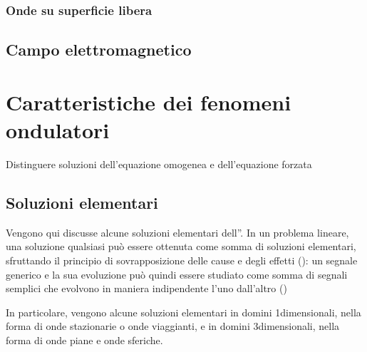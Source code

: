 \documentclass[letterpaper,10pt,italian]{jupyterBook}
\begin{document}
\subsubsection{Onde su superficie libera}
\label{\detokenize{ch/waves/waves-in-physics:onde-su-superficie-libera}}\label{\detokenize{ch/waves/waves-in-physics:physics-hs-waves-equation-examples-fluids-surface}}

\subsection{Campo elettromagnetico}
\label{\detokenize{ch/waves/waves-in-physics:campo-elettromagnetico}}\label{\detokenize{ch/waves/waves-in-physics:physics-hs-waves-equation-examples-em}}
\sphinxstepscope


\section{Caratteristiche dei fenomeni ondulatori}
\label{\detokenize{ch/waves/phenomena:caratteristiche-dei-fenomeni-ondulatori}}\label{\detokenize{ch/waves/phenomena:physics-hs-waves-phenomena}}\label{\detokenize{ch/waves/phenomena::doc}}
\sphinxAtStartPar
Distinguere soluzioni dell’equazione omogenea e dell’equazione forzata


\subsection{Soluzioni elementari}
\label{\detokenize{ch/waves/phenomena:soluzioni-elementari}}\label{\detokenize{ch/waves/phenomena:physics-hs-waves-equation-solutions}}
\sphinxAtStartPar
Vengono qui discusse alcune soluzioni elementari dell”. In un problema lineare, una soluzione qualsiasi può essere ottenuta come somma di soluzioni elementari, sfruttando il principio di sovrapposizione delle cause e degli effetti (): un segnale generico e la sua evoluzione può quindi essere studiato come somma di segnali semplici che evolvono in maniera indipendente l’uno dall’altro ()

\sphinxAtStartPar
In particolare, vengono alcune soluzioni elementari in domini 1\sphinxhyphen{}dimensionali, nella forma di onde stazionarie o onde viaggianti, e in domini 3\sphinxhyphen{}dimensionali, nella forma di onde piane e onde sferiche.
\end{document}

